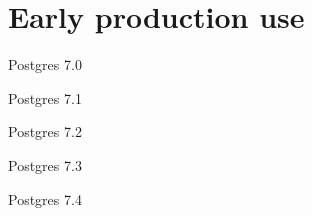 \documentclass{beamer}
\begin{document}

\section{Early production use}
\begin{frame}{Postgres 7.0}
\end{frame}
\begin{frame}{Postgres 7.1}
\end{frame}
\begin{frame}{Postgres 7.2}
\end{frame}
\begin{frame}{Postgres 7.3}
\end{frame}
\begin{frame}{Postgres 7.4}
\end{frame}
\end{document}
